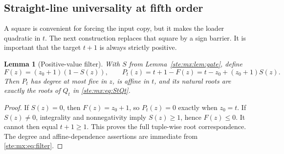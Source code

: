 \documentclass[11pt,letterpaper]{article}
\newtheorem{lemma}[theorem]{Lemma}
\theoremstyle{definition}
\theoremstyle{remark}
\begin{document}
\subsection{Straight-line universality at fifth order}

A square is convenient for forcing the input copy, but it makes the loader
quadratic in $t$. The next construction replaces that square by a sign barrier.
It is important that the target $t+1$ is always strictly positive.

\begin{lemma}[Positive-value filter]\label{ste:mx:lem:positivefilter}
With $S$ from Lemma~\ref{ste:mx:lem:gate}, define
\begin{equation}\label{ste:mx:eq:filter}
 F(z)=(z_0+1)(1-S(z)),\qquad
 P_t(z)=t+1-F(z)=t-z_0+(z_0+1)S(z).
\end{equation}
Then $P_t$ has degree at most five in $z$, is affine in $t$, and its natural
roots are exactly the roots of $Q_t$ in \eqref{ste:mx:eq:StQt}.
\end{lemma}
\begin{proof}
If $S(z)=0$, then $F(z)=z_0+1$, so $P_t(z)=0$ exactly when $z_0=t$.
If $S(z)\ne0$, integrality and nonnegativity imply $S(z)\geq1$, hence
$F(z)\leq0$. It cannot then equal $t+1\geq1$. This proves the full tuple-wise
root correspondence. The degree and affine-dependence assertions are immediate
from \eqref{ste:mx:eq:filter}.
\end{proof}
\end{document}
